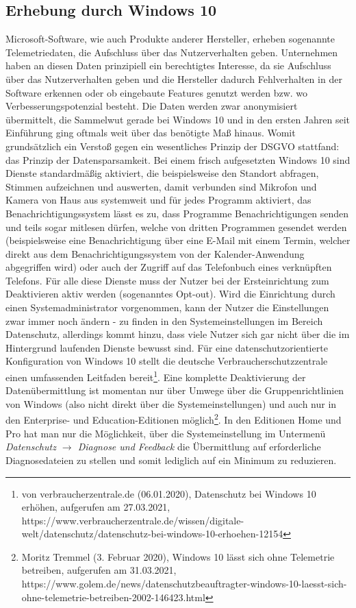 \subsection{Erhebung durch Windows 10}
Microsoft-Software, wie auch Produkte anderer Hersteller, erheben sogenannte Telemetriedaten, die Aufschluss über das Nutzerverhalten geben. Unternehmen haben an diesen Daten prinzipiell ein berechtigtes Interesse, da sie Aufschluss über das Nutzerverhalten geben und die Hersteller dadurch Fehlverhalten in der Software erkennen oder ob eingebaute Features genutzt werden bzw. wo Verbesserungspotenzial besteht. Die Daten werden zwar anonymisiert übermittelt, die Sammelwut gerade bei Windows 10 und in den ersten Jahren seit Einführung ging oftmals weit über das benötigte Maß hinaus. Womit grundsätzlich ein Verstoß gegen ein wesentliches Prinzip der DSGVO stattfand: das Prinzip der Datensparsamkeit. Bei einem frisch aufgesetzten Windows 10 sind Dienste standardmäßig aktiviert, die beispielsweise den Standort abfragen, Stimmen aufzeichnen und auswerten, damit verbunden sind Mikrofon und Kamera von Haus aus systemweit und für jedes Programm aktiviert, das Benachrichtigungssystem lässt es zu, dass Programme Benachrichtigungen senden und teils sogar mitlesen dürfen, welche von dritten Programmen gesendet werden (beispielsweise eine Benachrichtigung über eine E-Mail mit einem Termin, welcher direkt aus dem Benachrichtigungssystem von der Kalender-Anwendung abgegriffen wird) oder auch der Zugriff auf das Telefonbuch eines verknüpften Telefons. Für alle diese Dienste muss der Nutzer bei der Ersteinrichtung zum Deaktivieren aktiv werden (sogenanntes Opt-out). Wird die Einrichtung durch einen Systemadministrator vorgenommen, kann der Nutzer die Einstellungen zwar immer noch ändern - zu finden in den Systemeinstellungen im Bereich \glqq Datenschutz\grqq{}, allerdings kommt hinzu, dass viele Nutzer sich gar nicht über die im Hintergrund laufenden Dienste bewusst sind. Für eine datenschutzorientierte Konfiguration von Windows 10 stellt die deutsche Verbraucherschutzzentrale einen umfassenden Leitfaden bereit\footnote{von verbraucherzentrale.de (06.01.2020), Datenschutz bei Windows 10 erhöhen, aufgerufen am 27.03.2021, https://www.verbraucherzentrale.de/wissen/digitale-welt/datenschutz/datenschutz-bei-windows-10-erhoehen-12154}. Eine komplette Deaktivierung der Datenübermittlung ist momentan nur über Umwege über die Gruppenrichtlinien von Windows (also nicht direkt über die Systemeinstellungen) und auch nur in den Enterprise- und Education-Editionen möglich\footnote{Moritz Tremmel (3. Februar 2020), Windows 10 lässt sich ohne Telemetrie betreiben, aufgerufen am 31.03.2021, https://www.golem.de/news/datenschutzbeauftragter-windows-10-laesst-sich-ohne-telemetrie-betreiben-2002-146423.html}. In den Editionen Home und Pro hat man nur die Möglichkeit, über die Systemeinstellung im Untermenü \textit{Datenschutz $\rightarrow$ Diagnose und Feedback} die Übermittlung auf \glqq erforderliche Diagnosedateien\grqq{} zu stellen und somit lediglich auf ein Minimum zu reduzieren.\\

